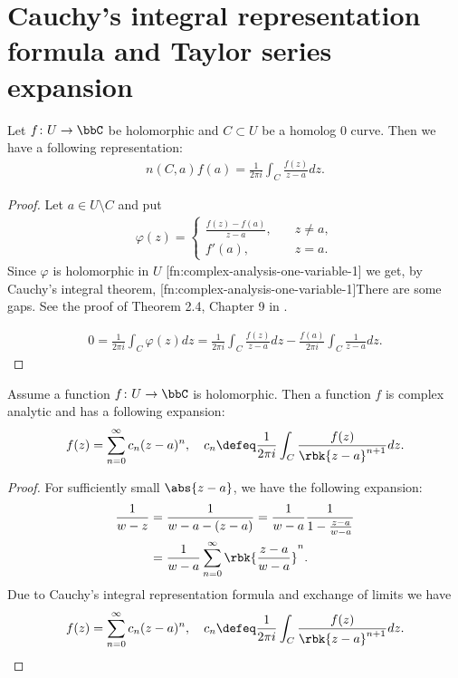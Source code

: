 \documentclass[openany, a4paper, oneside]{jsbook}
\begin{document}
\section{Cauchy's integral representation formula and Taylor series expansion}

\begin{thm}
 Let $f \colon U \to \bbC$ be holomorphic and $C \subset U$ be a homolog 0 curve.
 Then we have a following representation:
 \begin{align}
  n (C, a) f (a)
  =
  \frac{1}{2 \pi i} \int_C \frac{f (z)}{z - a} dz.
 \end{align}
\end{thm}
\begin{proof}
Let $a \in U \setminus C$ and put
\begin{align}
 \varphi (z)
 =
 \begin{cases}
  \frac{f (z) - f (a)}{z - a}, &\quad z \neq a, \\
  f'(a), &\quad z = a.
 \end{cases}
\end{align}
Since $\varphi$ is holomorphic in $U$ [fn:complex-analysis-one-variable-1]
we get, by Cauchy's integral theorem,
[fn:complex-analysis-one-variable-1]There are some gaps. See the proof of Theorem 2.4, Chapter 9 in \cite{MitsuoSugiura2}.


\begin{align}
 0
 =
 \frac{1}{2 \pi i} \int_C \varphi (z) dz
 =
 \frac{1}{2 \pi i} \int_C \frac{f (z)}{z-a} dz - \frac{f (a)}{2 \pi i} \int_C \frac{1}{z-a} dz.
\end{align}
\end{proof}
\begin{thm}
 Assume a function $f \colon U \to \bbC$ is holomorphic.
 Then a function $f$ is complex analytic and has a following expansion:
 \begin{align}
  f (z)
  =
  \sum_{n = 0}^{\infty} c_n (z-a)^n, \quad
  c_n \defeq \frac{1}{2 \pi i} \int_C \frac{f (z)}{\rbk{z - a}^{n+1}} dz.
 \end{align}
\end{thm}
\begin{proof}
 For sufficiently small $\abs{z-a}$, we have the following expansion:
 \begin{align}
  \frac{1}{w - z}
  &=
  \frac{1}{w - a - (z - a)} = \frac{1}{w - a} \frac{1}{1 - \frac{z - a}{w - a}} \\
  &=
  \frac{1}{w - a} \sum_{n=0}^{\infty} \rbk{\frac{z-a}{w - a}}^n.
 \end{align}
Due to Cauchy's integral representation formula and exchange of limits we have
\begin{align}
 f (z)
 =
 \sum_{n = 0}^{\infty} c_n (z-a)^n, \quad
 c_n \defeq \frac{1}{2 \pi i} \int_C \frac{f (z)}{\rbk{z - a}^{n+1}} dz.
\end{align}
\end{proof}
\end{document}
